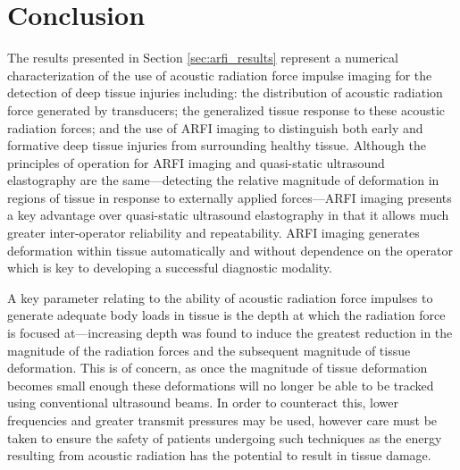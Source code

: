 	\section{Conclusion}
		The results presented in Section \ref{sec:arfi_results} represent a numerical characterization of the use of acoustic radiation force impulse imaging for the detection of deep tissue injuries including: the distribution of acoustic radiation force generated by transducers; the generalized tissue response to these acoustic radiation forces; and the use of ARFI imaging to distinguish both early and formative deep tissue injuries from surrounding healthy tissue. Although the principles of operation for ARFI imaging and quasi-static ultrasound elastography are the same---detecting the relative magnitude of deformation in regions of tissue in response to externally applied forces---ARFI imaging presents a key advantage over quasi-static ultrasound elastography in that it allows much greater inter-operator reliability and repeatability. ARFI imaging generates deformation within tissue automatically and without dependence on the operator which is key to developing a successful diagnostic modality.

		A key parameter relating to the ability of acoustic radiation force impulses to generate adequate body loads in tissue is the depth at which the radiation force is focused at---increasing depth was found to induce the greatest reduction in the magnitude of the radiation forces and the subsequent magnitude of tissue deformation. This is of concern, as once the magnitude of tissue deformation becomes small enough these deformations will no longer be able to be tracked using conventional ultrasound beams. In order to counteract this, lower frequencies and greater transmit pressures may be used, however care must be taken to ensure the safety of patients undergoing such techniques as the energy resulting from acoustic radiation has the potential to result in tissue damage.

